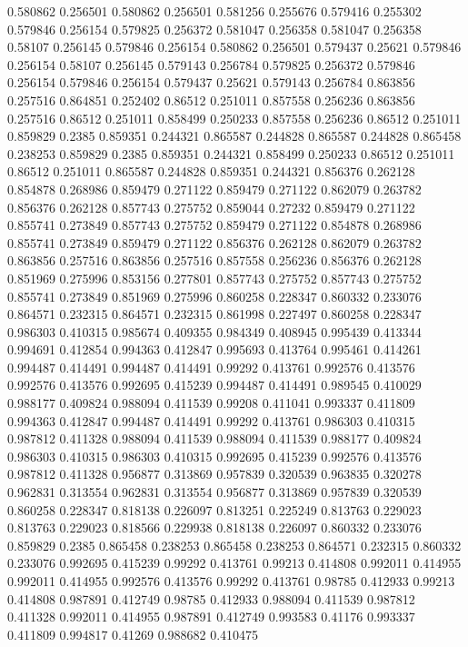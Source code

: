 0.580862 0.256501
0.580862 0.256501
0.581256 0.255676
0.579416 0.255302
0.579846 0.256154
0.579825 0.256372
0.581047 0.256358
0.581047 0.256358
0.58107 0.256145
0.579846 0.256154
0.580862 0.256501
0.579437 0.25621
0.579846 0.256154
0.58107 0.256145
0.579143 0.256784
0.579825 0.256372
0.579846 0.256154
0.579846 0.256154
0.579437 0.25621
0.579143 0.256784
0.863856 0.257516
0.864851 0.252402
0.86512 0.251011
0.857558 0.256236
0.863856 0.257516
0.86512 0.251011
0.858499 0.250233
0.857558 0.256236
0.86512 0.251011
0.859829 0.2385
0.859351 0.244321
0.865587 0.244828
0.865587 0.244828
0.865458 0.238253
0.859829 0.2385
0.859351 0.244321
0.858499 0.250233
0.86512 0.251011
0.86512 0.251011
0.865587 0.244828
0.859351 0.244321
0.856376 0.262128
0.854878 0.268986
0.859479 0.271122
0.859479 0.271122
0.862079 0.263782
0.856376 0.262128
0.857743 0.275752
0.859044 0.27232
0.859479 0.271122
0.855741 0.273849
0.857743 0.275752
0.859479 0.271122
0.854878 0.268986
0.855741 0.273849
0.859479 0.271122
0.856376 0.262128
0.862079 0.263782
0.863856 0.257516
0.863856 0.257516
0.857558 0.256236
0.856376 0.262128
0.851969 0.275996
0.853156 0.277801
0.857743 0.275752
0.857743 0.275752
0.855741 0.273849
0.851969 0.275996
0.860258 0.228347
0.860332 0.233076
0.864571 0.232315
0.864571 0.232315
0.861998 0.227497
0.860258 0.228347
0.986303 0.410315
0.985674 0.409355
0.984349 0.408945
0.995439 0.413344
0.994691 0.412854
0.994363 0.412847
0.995693 0.413764
0.995461 0.414261
0.994487 0.414491
0.994487 0.414491
0.99292 0.413761
0.992576 0.413576
0.992576 0.413576
0.992695 0.415239
0.994487 0.414491
0.989545 0.410029
0.988177 0.409824
0.988094 0.411539
0.99208 0.411041
0.993337 0.411809
0.994363 0.412847
0.994487 0.414491
0.99292 0.413761
0.986303 0.410315
0.987812 0.411328
0.988094 0.411539
0.988094 0.411539
0.988177 0.409824
0.986303 0.410315
0.986303 0.410315
0.992695 0.415239
0.992576 0.413576
0.987812 0.411328
0.956877 0.313869
0.957839 0.320539
0.963835 0.320278
0.962831 0.313554
0.962831 0.313554
0.956877 0.313869
0.957839 0.320539
0.860258 0.228347
0.818138 0.226097
0.813251 0.225249
0.813763 0.229023
0.813763 0.229023
0.818566 0.229938
0.818138 0.226097
0.860332 0.233076
0.859829 0.2385
0.865458 0.238253
0.865458 0.238253
0.864571 0.232315
0.860332 0.233076
0.992695 0.415239
0.99292 0.413761
0.99213 0.414808
0.992011 0.414955
0.992011 0.414955
0.992576 0.413576
0.99292 0.413761
0.98785 0.412933
0.99213 0.414808
0.987891 0.412749
0.98785 0.412933
0.988094 0.411539
0.987812 0.411328
0.992011 0.414955
0.987891 0.412749
0.993583 0.41176
0.993337 0.411809
0.994817 0.41269
0.988682 0.410475
